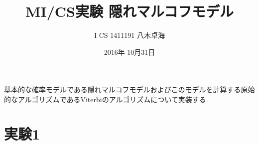 \documentclass[a4paper]{jarticle}
\title{MI/CS実験 隠れマルコフモデル}
\author{I CS 1411191 八木卓海}
\date{2016年 10月31日}
\begin{document}
\maketitle
基本的な確率モデルである隠れマルコフモデルおよびこのモデルを計算する原始的なアルゴリズムであるViterbiのアルゴリズムについて実装する.

\section{実験1}
\end{document}
